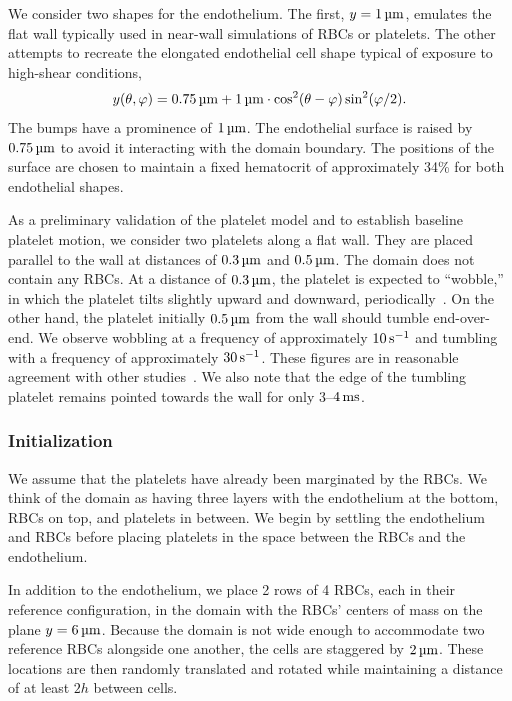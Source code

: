 We consider two shapes for the endothelium. The first, $y=1\um$, emulates the flat wall typically used in
near-wall simulations of RBCs or platelets. The other attempts to recreate the elongated endothelial cell shape
typical of exposure to high-shear conditions,
\begin{equation}
    y(\theta, \varphi) = 0.75\um + 1\um\cdot\cos^2(\theta-\varphi)\sin^2(\varphi/2).
\end{equation}
The bumps have a prominence of $1\um$. The endothelial surface is raised by $0.75\um$ to avoid it interacting with
the domain boundary. The positions of the surface are chosen to maintain a fixed hematocrit of approximately 34\%
for both endothelial shapes.

As a preliminary validation of the platelet model and to establish baseline platelet motion, we consider two
platelets along a flat wall. They are placed parallel to the wall at distances of $0.3\um$ and $0.5\um$. The
domain does not contain any RBCs. At a distance of $0.3\um$, the platelet is expected to ``wobble\qend,'' in which
the platelet tilts slightly upward and downward, periodically~\cite{King:2005fv}. On the other hand, the platelet
initially $0.5\um$ from the wall should tumble end-over-end. We observe wobbling at a frequency of approximately
$10\persec$ and tumbling with a frequency of approximately $30\persec$. These figures are in reasonable agreement
with other studies~\cite{King:2005fv}. We also note that the edge of the tumbling platelet remains pointed towards
the wall for only 3--$4\ms$.

\subsubsection{Initialization}\label{sec:blood-init}

We assume that the platelets have already been marginated by the RBCs. We think of the domain as having three
layers with the endothelium at the bottom, RBCs on top, and platelets in between. We begin by settling the
endothelium and RBCs before placing platelets in the space between the RBCs and the endothelium.

In addition to the endothelium, we place 2 rows of 4 RBCs, each in their reference configuration, in the domain
with the RBCs' centers of mass on the plane $y=6\um$.  Because the domain is not wide enough to accommodate two
reference RBCs alongside one another, the cells are staggered by $2\um$. These locations are then randomly
translated and rotated while maintaining a distance of at least $2h$ between cells.

